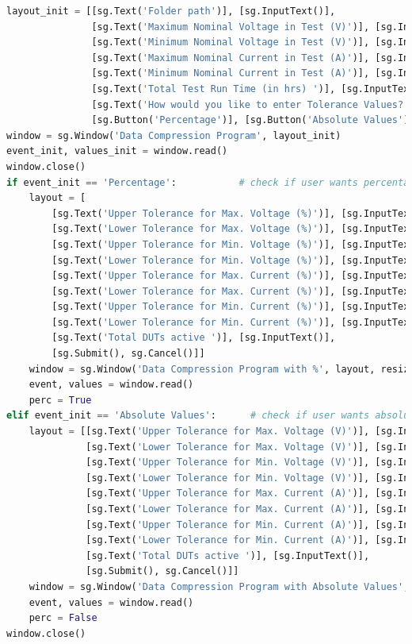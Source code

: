 \begin{lstlisting}[language=Python]
layout_init = [[sg.Text('Folder path')], [sg.InputText()],
               [sg.Text('Maximum Nominal Voltage in Test (V)')], [sg.InputText()],
               [sg.Text('Minimum Nominal Voltage in Test (V)')], [sg.InputText()],
               [sg.Text('Maximum Nominal Current in Test (A)')], [sg.InputText()],
               [sg.Text('Minimum Nominal Current in Test (A)')], [sg.InputText()],
               [sg.Text('Total Test Run Time (in hrs) ')], [sg.InputText()],
               [sg.Text('How would you like to enter Tolerance Values?')],
               [sg.Button('Percentage')], [sg.Button('Absolute Values')]]
window = sg.Window('Data Compression Program', layout_init)
event_init, values_init = window.read()
window.close()
if event_init == 'Percentage':           # check if user wants percentage input or not
    layout = [
        [sg.Text('Upper Tolerance for Max. Voltage (%)')], [sg.InputText()],
        [sg.Text('Lower Tolerance for Max. Voltage (%)')], [sg.InputText()],
        [sg.Text('Upper Tolerance for Min. Voltage (%)')], [sg.InputText()],
        [sg.Text('Lower Tolerance for Min. Voltage (%)')], [sg.InputText()],
        [sg.Text('Upper Tolerance for Max. Current (%)')], [sg.InputText()],
        [sg.Text('Lower Tolerance for Max. Current (%)')], [sg.InputText()],
        [sg.Text('Upper Tolerance for Min. Current (%)')], [sg.InputText()],
        [sg.Text('Lower Tolerance for Min. Current (%)')], [sg.InputText()],
        [sg.Text('Total DUTs active ')], [sg.InputText()],
        [sg.Submit(), sg.Cancel()]]
    window = sg.Window('Data Compression Program with %', layout, resizable=True)
    event, values = window.read()
    perc = True
elif event_init == 'Absolute Values':      # check if user wants absolute input or not
    layout = [[sg.Text('Upper Tolerance for Max. Voltage (V)')], [sg.InputText()],
              [sg.Text('Lower Tolerance for Max. Voltage (V)')], [sg.InputText()],
              [sg.Text('Upper Tolerance for Min. Voltage (V)')], [sg.InputText()],
              [sg.Text('Lower Tolerance for Min. Voltage (V)')], [sg.InputText()],
              [sg.Text('Upper Tolerance for Max. Current (A)')], [sg.InputText()],
              [sg.Text('Lower Tolerance for Max. Current (A)')], [sg.InputText()],
              [sg.Text('Upper Tolerance for Min. Current (A)')], [sg.InputText()],
              [sg.Text('Lower Tolerance for Min. Current (A)')], [sg.InputText()],
              [sg.Text('Total DUTs active ')], [sg.InputText()],
              [sg.Submit(), sg.Cancel()]]
    window = sg.Window('Data Compression Program with Absolute Values', layout, resizable=True)
    event, values = window.read()
    perc = False
window.close()
\end{lstlisting}

